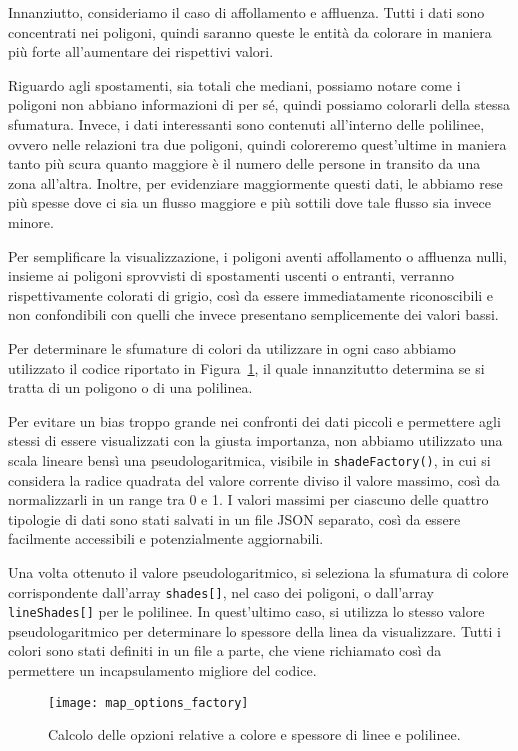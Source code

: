 Innanziutto, consideriamo il caso di affollamento e affluenza. Tutti i dati sono concentrati nei poligoni, quindi saranno queste le entità da colorare in maniera più forte all'aumentare dei rispettivi valori.

Riguardo agli spostamenti, sia totali che mediani, possiamo notare come i poligoni non abbiano informazioni di per sé, quindi possiamo colorarli della stessa sfumatura. Invece, i dati interessanti sono contenuti all'interno delle polilinee, ovvero nelle relazioni tra due poligoni, quindi coloreremo quest'ultime in maniera tanto più scura quanto maggiore è il numero delle persone in transito da una zona all'altra. Inoltre, per evidenziare maggiormente questi dati, le abbiamo rese più spesse dove ci sia un flusso maggiore e più sottili dove tale flusso sia invece minore.

Per semplificare la visualizzazione, i poligoni aventi affollamento o affluenza nulli, insieme ai poligoni sprovvisti di spostamenti uscenti o entranti, verranno rispettivamente colorati di grigio, così da essere immediatamente riconoscibili e non confondibili con quelli che invece presentano semplicemente dei valori bassi.

Per determinare le sfumature di colori da utilizzare in ogni caso abbiamo utilizzato il codice riportato in Figura~\ref{fig:map_options_factory}, il quale innanzitutto determina se si tratta di un poligono o di una polilinea.

Per evitare un bias troppo grande nei confronti dei dati piccoli e permettere agli stessi di essere visualizzati con la giusta importanza, non abbiamo utilizzato una scala lineare bensì una pseudologaritmica, visibile in \Verb_shadeFactory()_, in cui si considera la radice quadrata del valore corrente diviso il valore massimo, così da normalizzarli in un range tra 0 e 1. I valori massimi per ciascuno delle quattro tipologie di dati sono stati salvati in un file JSON separato, così da essere facilmente accessibili e potenzialmente aggiornabili.

Una volta ottenuto il valore pseudologaritmico, si seleziona la sfumatura di colore corrispondente dall'array \Verb_shades[]_, nel caso dei poligoni, o dall'array \Verb_lineShades[]_ per le polilinee. In quest'ultimo caso, si utilizza lo stesso valore pseudologaritmico per determinare lo spessore della linea da visualizzare. Tutti i colori sono stati definiti in un file a parte, che viene richiamato così da permettere un incapsulamento migliore del codice.

\begin{figure}[H]
    \centering
    \texttt{[image: map\_options\_factory]}
    \caption[Calcolo delle opzioni su colore e spessore]{Calcolo delle opzioni relative a colore e spessore di linee e polilinee.}
    \label{fig:map_options_factory}
\end{figure}

